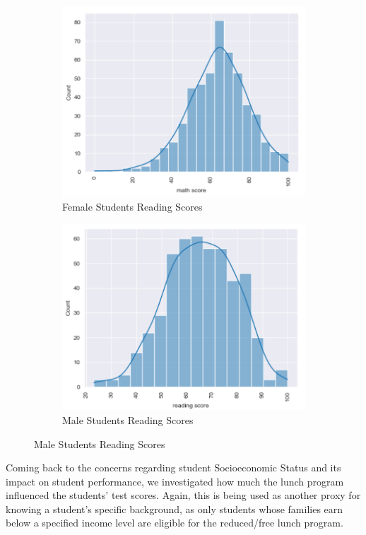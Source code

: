\documentclass[man,floatsintext]{apa6} %
\begin{document}
\begin{figure}[H]
    \centering
    \caption{Reading Standardized Scores by Gender}
    \begin{subfigure}[b]{0.4\textwidth}
        \includegraphics[width=\linewidth]{FemaleStudentsMathScoreCurve.png}
        \caption{Female Students Reading Scores}
        \label{fig:FemaleRead}
    \end{subfigure}
    \begin{subfigure}[b]{0.4\textwidth}
        \includegraphics[width=\linewidth]{MaleStudentReadingScoreCurve.png}
        \caption{Male Students Reading Scores}
        \label{fig:MaleRead}
    \end{subfigure}
    \label{fig:FemaleMaleGraphsR}
\end{figure}
Coming back to the concerns regarding student Socioeconomic Status and its impact on student performance, we investigated how much the lunch program influenced the students' test scores.  Again, this is being used as another proxy for knowing a student's specific background, as only students whose families earn below a specified income level are eligible for the reduced/free lunch program.
\end{document}
